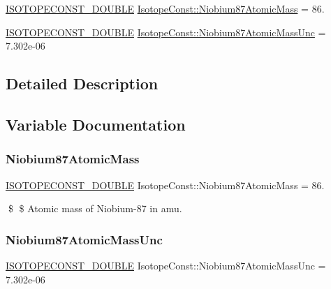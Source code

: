 \begin{DoxyCompactItemize}
\item 
\mbox{\hyperlink{group___isotope_const-_macros_ga8f45a7272ce02c0b4c65c44636ed719a}{I\+S\+O\+T\+O\+P\+E\+C\+O\+N\+S\+T\+\_\+\+D\+O\+U\+B\+LE}} \mbox{\hyperlink{group___isotope_const-_niobium-_nb87_ga7004dad38c14183ff94e350000bf7a73}{Isotope\+Const\+::\+Niobium87\+Atomic\+Mass}} = 86.
\item 
\mbox{\hyperlink{group___isotope_const-_macros_ga8f45a7272ce02c0b4c65c44636ed719a}{I\+S\+O\+T\+O\+P\+E\+C\+O\+N\+S\+T\+\_\+\+D\+O\+U\+B\+LE}} \mbox{\hyperlink{group___isotope_const-_niobium-_nb87_ga4cbda6ed6ea9256273dbeda546303ad8}{Isotope\+Const\+::\+Niobium87\+Atomic\+Mass\+Unc}} = 7.\+302e-\/06
\end{DoxyCompactItemize}


\subsection{Detailed Description}


\subsection{Variable Documentation}
\mbox{\label{group___isotope_const-_niobium-_nb87_ga7004dad38c14183ff94e350000bf7a73}} 
\subsubsection{\texorpdfstring{Niobium87\+Atomic\+Mass}{Niobium87AtomicMass}}
{\footnotesize\ttfamily \mbox{\hyperlink{group___isotope_const-_macros_ga8f45a7272ce02c0b4c65c44636ed719a}{I\+S\+O\+T\+O\+P\+E\+C\+O\+N\+S\+T\+\_\+\+D\+O\+U\+B\+LE}} Isotope\+Const\+::\+Niobium87\+Atomic\+Mass = 86.}

\$ \$ Atomic mass of Niobium-\/87 in amu. \mbox{\label{group___isotope_const-_niobium-_nb87_ga4cbda6ed6ea9256273dbeda546303ad8}} 
\subsubsection{\texorpdfstring{Niobium87\+Atomic\+Mass\+Unc}{Niobium87AtomicMassUnc}}
{\footnotesize\ttfamily \mbox{\hyperlink{group___isotope_const-_macros_ga8f45a7272ce02c0b4c65c44636ed719a}{I\+S\+O\+T\+O\+P\+E\+C\+O\+N\+S\+T\+\_\+\+D\+O\+U\+B\+LE}} Isotope\+Const\+::\+Niobium87\+Atomic\+Mass\+Unc = 7.\+302e-\/06}

